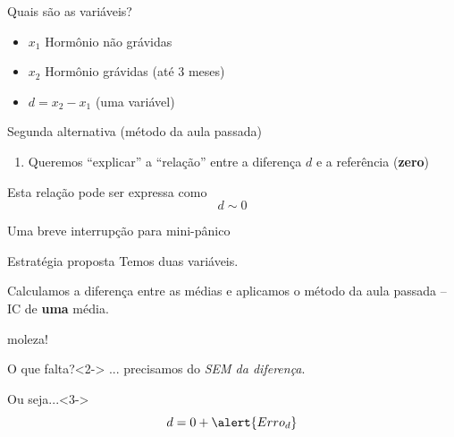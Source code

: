 \documentclass{beamer}
\begin{document}
\begin{frame}{Quais são as variáveis?}
  \begin{itemize}
  \item $x_1$ Hormônio não grávidas
  \item $x_2$ Hormônio grávidas (até 3 meses)
  \item $d = x_2 - x _1$ (uma variável)
  \end{itemize}
  \begin{block}{Segunda alternativa (método da aula passada)}
    \begin{enumerate}
    \item Queremos ``explicar'' a ``relação'' entre a diferença $d$ e a referência ({\bf zero})
    \end{enumerate}
  \end{block}
  \begin{block}{Esta relação pode ser expressa como}
    \begin{displaymath}
      d \sim 0
    \end{displaymath}
  \end{block}
\end{frame}

\begin{frame}{Uma breve interrupção para mini-pânico}
  \begin{block}{Estratégia proposta}
    Temos duas variáveis.

    \bigskip
    Calculamos a \alert{diferença} entre as médias e aplicamos o método da aula passada -- IC de {\bf uma} média.

    \begin{center}
      moleza!
    \end{center}
  \end{block}
  \begin{block}{O que falta?}<2->
    ... precisamos do {\em SEM da diferença}.
  \end{block}
  \begin{block}{Ou seja...}<3->
    \begin{displaymath}
      d = 0 + \alert{Erro_d}
    \end{displaymath}
  \end{block}

\end{frame}
\end{document}
